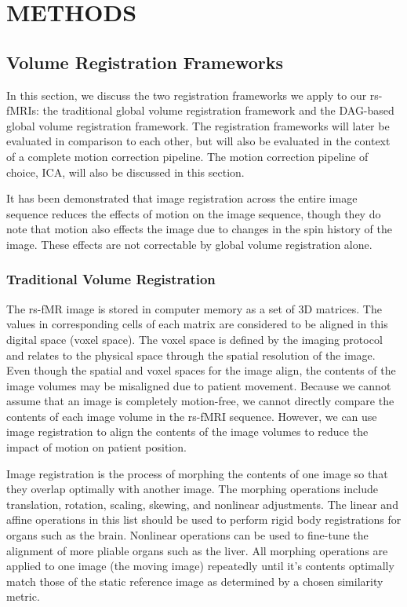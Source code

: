 \chapter{METHODS}
\label{ch:methods}

\section{Volume Registration Frameworks}

In this section, we discuss the two registration frameworks we apply to our rs-fMRIs: the traditional global volume registration framework and the DAG-based global volume registration framework. The registration frameworks will later be evaluated in comparison to each other, but will also be evaluated in the context of a complete motion correction pipeline. The motion correction pipeline of choice, ICA, will also be discussed in this section.

It has been demonstrated that image registration across the entire image sequence reduces the effects of motion on the image sequence, though they do note that motion also effects the image due to changes in the spin history of the image. These effects are not correctable by global volume registration alone. %

\subsection{Traditional Volume Registration}

The rs-fMR image is stored in computer memory as a set of 3D matrices. The values in corresponding cells of each matrix are considered to be aligned in this digital space (voxel space). The voxel space is defined by the imaging protocol and relates to the physical space through the spatial resolution of the image. Even though the spatial and voxel spaces for the image align, the contents of the image volumes may be misaligned due to patient movement. Because we cannot assume that an image is completely motion-free, we cannot directly compare the contents of each image volume in the rs-fMRI sequence. However, we can use image registration to align the contents of the image volumes to reduce the impact of motion on patient position.

Image registration is the process of morphing the contents of one image so that they overlap optimally with another image. The morphing operations include translation, rotation, scaling, skewing, and nonlinear adjustments. The linear and affine operations in this list should be used to perform rigid body registrations for organs such as the brain. Nonlinear operations can be used to fine-tune the alignment of more pliable organs such as the liver. All morphing operations are applied to one image (the moving image) repeatedly until it's contents optimally match those of the static reference image as determined by a chosen similarity metric. 

